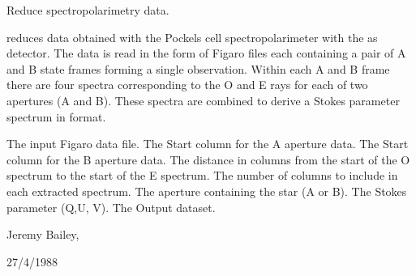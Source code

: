 \begin{manroutinedescription}
        Reduce {} spectropolarimetry data.

        {} reduces data obtained with the {} %
Pockels cell
        spectropolarimeter with the {} as detector. The data is read
        in the form of Figaro files each containing a pair of A and B
        state frames forming a single observation. Within each A and
        B frame there are four spectra corresponding to the O and E rays
        for each of two apertures (A and B). These spectra are combined
        to derive a Stokes parameter spectrum in {} format.

\begin{manparametertable}
     The input Figaro data file.
  The Start column for the A %
aperture data.
  The Start column for the B %
aperture data.
  The distance in columns from %
the start of the O
                               spectrum to the start of the E spectrum.
  The number of columns to %
include in each
                               extracted spectrum.
     The aperture containing the %
star (A or B).
     The Stokes parameter (Q,U,%
V).
  The %
Output dataset.

\end{manparametertable}
         Jeremy Bailey, {}

         27/4/1988

\end{manroutinedescription}
